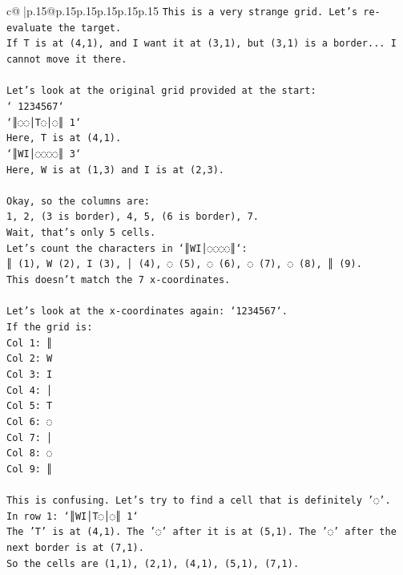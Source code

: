 \documentclass{article}
\begin{document}
{\begin{supertabular}{c@{$\;$}|p{.15\linewidth}@{}p{.15\linewidth}p{.15\linewidth}p{.15\linewidth}p{.15\linewidth}p{.15\linewidth}}
{{{\texttt{This is a very strange grid. Let's re{-}evaluate the target.} \\
\texttt{If T is at (4,1), and I want it at (3,1), but (3,1) is a border... I cannot move it there.} \\
\\ 
\texttt{Let's look at the original grid provided at the start:} \\
\texttt{` 1234567`} \\
\texttt{`║◌◌│T◌│◌║ 1`} \\
\texttt{Here, T is at (4,1).} \\
\texttt{`║WI│◌◌◌◌║ 3`} \\
\texttt{Here, W is at (1,3) and I is at (2,3).} \\
\\ 
\texttt{Okay, so the columns are:} \\
\texttt{1, 2, (3 is border), 4, 5, (6 is border), 7.} \\
\texttt{Wait, that's only 5 cells.} \\
\texttt{Let's count the characters in `║WI│◌◌◌◌║`:} \\
\texttt{║ (1), W (2), I (3), │ (4), ◌ (5), ◌ (6), ◌ (7), ◌ (8), ║ (9).} \\
\texttt{This doesn't match the 7 x{-}coordinates.} \\
\\ 
\texttt{Let's look at the x{-}coordinates again: `1234567`.} \\
\texttt{If the grid is:} \\
\texttt{Col 1: ║} \\
\texttt{Col 2: W} \\
\texttt{Col 3: I} \\
\texttt{Col 4: │} \\
\texttt{Col 5: T} \\
\texttt{Col 6: ◌} \\
\texttt{Col 7: │} \\
\texttt{Col 8: ◌} \\
\texttt{Col 9: ║} \\
\\ 
\texttt{This is confusing. Let's try to find a cell that is definitely '◌'.} \\
\texttt{In row 1: `║WI│T◌│◌║ 1`} \\
\texttt{The 'T' is at (4,1). The '◌' after it is at (5,1). The '◌' after the next border is at (7,1).} \\
\texttt{So the cells are (1,1), (2,1), (4,1), (5,1), (7,1).} \\
}}}
\end{supertabular}}
\end{document}
